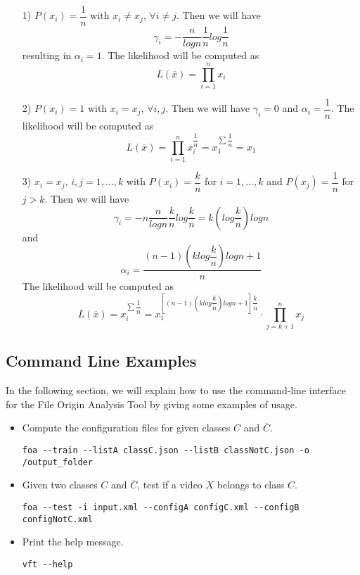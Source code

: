 \begin{itemize}

\item[1)] $P(x_{i}) = \dfrac{1}{n} $ with $x_{i} \neq x_{j}$, $ \forall i \neq j $.
Then we will have $$ \gamma_{i} = - \dfrac{n}{log n} \dfrac{1}{n} log\dfrac{1}{n} $$ resulting in $\alpha_{i} = 1$.
The likelihood will be computed as $$L(\overline{x}) = \prod\limits_{i=1}^{n} x_{i} $$

\item[2)] $P(x_{i}) = 1 $ with $x_{i} = x_{j}$, $ \forall i,j $.
Then we will have $ \gamma_{i} = 0 $ and $\alpha_{i} = \dfrac{1}{n} $.
The likelihood will be computed as $$L(\overline{x}) = \prod\limits_{i=1}^{n} x_{i}^{\dfrac{1}{n}} = x_{1}^{\sum \dfrac{1}{n}} = x_{1} $$

\item[3)]  $x_{i} = x_{j}$, $ i,j = 1,\ldots,k $ with $P(x_{i}) = \dfrac{k}{n} $ for $i = 1,\ldots,k$ and $P(x_{j}) = \dfrac{1}{n}$ for $j > k$.
Then we will have $$ \gamma_{i} = -n \dfrac{n}{log n} \dfrac{k}{n} log \dfrac{k}{n} = k (log \dfrac{k}{n})log n $$ and 
$$ \alpha_{i} = \dfrac{(n-1)(k log \dfrac{k}{n})log n + 1}{n} $$
The likelihood will be computed as $$L(\overline{x}) = x_{i}^{\sum \dfrac{1}{n}} = x_{1}^{\left[ (n-1)(k log \dfrac{k}{n})log n + 1 \right] \dfrac{k}{n}} \cdot \prod\limits_{j=k+1}^{n} x_{j}  $$

\end{itemize}

\subsection{Command Line Examples}


In the following section, we will explain how to use the command-line interface for the File Origin Analysis Tool by giving some examples of usage.

\begin{itemize}

\item Compute the configuration files for given classes $C$ and $\overline{C}$.
\begin{lstlisting}
foa --train --listA classC.json --listB classNotC.json -o /output_folder
\end{lstlisting}

\item Given two classes $C$ and $\overline{C}$, test if a video $X$ belongs to class $C$.
\begin{lstlisting}
foa --test -i input.xml --configA configC.xml --configB configNotC.xml
\end{lstlisting}

\item Print the help message.
\begin{lstlisting}
vft --help
\end{lstlisting}

\end{itemize}

